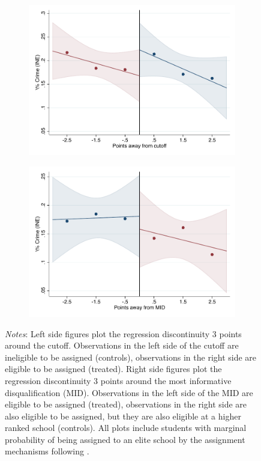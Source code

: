 \documentclass[oneside,11pt]{article}
\begin{document}
\begin{figure}[H]
\begin{center}
    \begin{subfigure}{0.475\textwidth}
        \centering
        \includegraphics[width=\textwidth]{04_Figures/rd_plot_tau_Suspencion_INE_UNAM3.pdf}
    \end{subfigure}
    \begin{subfigure}{0.475\textwidth}
        \centering
        \includegraphics[width=\textwidth]{04_Figures/rd_plot_mid_Suspencion_INE_UNAM3.pdf}
    \end{subfigure}
    \end{center}
    
\footnotesize
\textit{Notes}: Left side figures plot the regression discontinuity 3 points around the cutoff. Observations in the left side of the cutoff are ineligible to be assigned (controls), observations in the right side are eligible to be assigned (treated). Right side figures plot the regression discontinuity 3 points around the most informative disqualification (MID). Observations in the left side of the MID are eligible to be assigned (treated), observations in the right side are also eligible to be assigned, but they are also eligible at a higher ranked school (controls). All plots include students with marginal probability of being assigned to an elite school by the assignment mechanisms following \citet{abdulkadirouglu2022breaking}. 
\end{figure}
\end{document}
